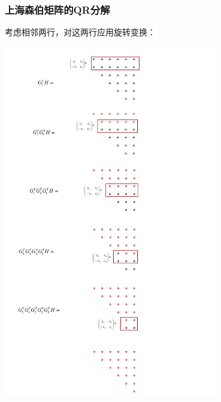 \documentclass[10pt]{beamer}
\begin{document}
	\begin{frame}
		\frametitle{上海森伯矩阵的QR分解}
	
		考虑相邻两行，对这两行应用旋转变换：

		\includegraphics[width=0.7\textwidth]{6.jpg}

	\end{frame}
\end{document}
